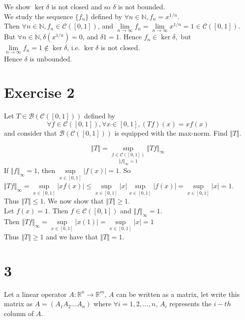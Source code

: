 \documentclass[12pt,a4paper]{article}
\newcommand{\N}{\mathbb{N}}
\newcommand{\R}{\mathbb{R}}
\theoremstyle{plain}
\theoremstyle{remark}
\theoremstyle{definition}
\begin{document}
We show $\ker \delta$ is not closed and so $\delta$ is not bounded.\\
We study the sequence $\{f_n\}$ defined by $\forall n \in \N, f_n = x^{1/n}$.\\
Then $\forall n \in \N, f_n \in \mathcal{C}([0,1])$, and $\lim\limits_{n\to \infty} f_n = \lim\limits_{n\to \infty}x^{1/n} = 1 \in \mathcal{C}([0,1])$.\\
But $\forall n \in \N, \delta (x^{1/n}) = 0$, and $\delta 1 = 1$. Hence $f_n \in \ker \delta,$ but $\lim\limits_{n\to \infty}f_n = 1 \not\in \ker\delta$, i.e. $\ker \delta$ is not closed.\\
Hence $\delta$ is unbounded.

\pagebreak
\section*{Exercise 2}
Let $T \in \mathcal{B}(\mathcal{C}([0,1]))$ defined by
$$\forall f \in \mathcal{C}([0,1]), \forall x\in [0,1], (Tf)(x) = xf(x)$$
and consider that $\mathcal{B}(\mathcal{C}([0,1]))$ is equipped with the max-norm. Find $\Vert T\Vert$.

$$\Vert T \Vert = \underset{\Vert f \Vert_{\infty} = 1}{\sup\limits_{f \in \mathcal{C}([0,1])}} \Vert Tf \Vert_{\infty}$$
If $\Vert f \Vert_{\infty} = 1$, then $\sup\limits_{x \in [0,1]} \vert f(x) \vert = 1$. So\\
$\Vert Tf \Vert_{\infty} = \sup\limits_{x \in [0,1]} \vert x f(x) \vert \le \sup\limits_{x \in [0,1]} \vert x \vert \sup\limits_{x \in [0,1]}\vert f(x) \vert = \sup\limits_{x \in [0,1]} \vert x \vert = 1$.\\
Thus $\Vert T \Vert \le 1$. We now show that $\Vert T \Vert \ge 1$.\\
Let $f(x) = 1$. Then $f\in\mathcal{C}([0,1])$ and $\Vert f \Vert_{\infty} = 1$.\\
Then $\Vert Tf \Vert_{\infty} = \sup\limits_{x \in [0,1]} \vert x (1) \vert = \sup\limits_{x \in [0,1]} \vert x \vert = 1$\\
Thus $\Vert T \Vert \ge 1$ and we have that $\Vert T \Vert = 1$.

\section*{3}
Let a linear operator $A:\R^n \to \R^m$, $A$ can be written as a matrix, let write this matrix as $A = (A_1 A_2 \ldots A_n)$ where $\forall i = 1,2,\ldots,n$, $A_i$ represents the $i-th$ column of $A$.
\end{document}
